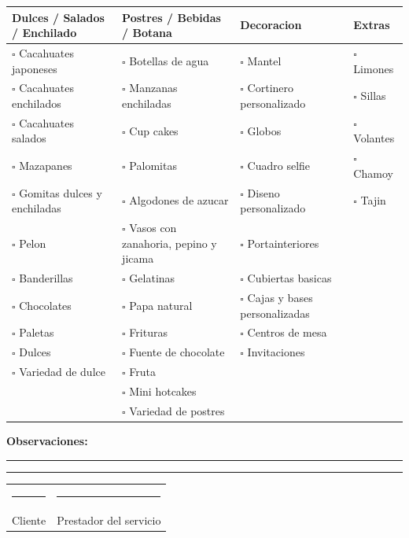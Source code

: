 \documentclass[letterpaper,11pt]{article}
\newcommand{\boxitem}[1]{$\square$ #1}
\begin{document}
\small
\begin{tabularx}{\textwidth}{|>{\raggedright\arraybackslash}X|>{\raggedright\arraybackslash}X|>{\raggedright\arraybackslash}X|>{\raggedright\arraybackslash}X|}
\hline
\centering\textbf{Dulces / Salados / Enchilado} &
\centering\textbf{Postres / Bebidas / Botana} &
\centering\textbf{Decoracion} &
\centering\arraybackslash\textbf{Extras} \\
\hline
\boxitem{Cacahuates japoneses} & \boxitem{Botellas de agua} & \boxitem{Mantel} & \boxitem{Limones} \\
\boxitem{Cacahuates enchilados} & \boxitem{Manzanas enchiladas} & \boxitem{Cortinero personalizado} & \boxitem{Sillas} \\
\boxitem{Cacahuates salados} & \boxitem{Cup cakes} & \boxitem{Globos} & \boxitem{Volantes} \\
\boxitem{Mazapanes} & \boxitem{Palomitas} & \boxitem{Cuadro selfie} & \boxitem{Chamoy} \\
\boxitem{Gomitas dulces y enchiladas} & \boxitem{Algodones de azucar} & \boxitem{Diseno personalizado} & \boxitem{Tajin} \\
\boxitem{Pelon} & \boxitem{Vasos con zanahoria, pepino y jicama} & \boxitem{Portainteriores} & \\
\boxitem{Banderillas} & \boxitem{Gelatinas} & \boxitem{Cubiertas basicas} & \\
\boxitem{Chocolates} & \boxitem{Papa natural} & \boxitem{Cajas y bases personalizadas} & \\
\boxitem{Paletas} & \boxitem{Frituras} & \boxitem{Centros de mesa} & \\
\boxitem{Dulces} & \boxitem{Fuente de chocolate} & \boxitem{Invitaciones} & \\
\boxitem{Variedad de dulce} & \boxitem{Fruta} & & \\
& \boxitem{Mini hotcakes} & & \\
& \boxitem{Variedad de postres} & & \\
\hline
\end{tabularx}

\normalsize
\vspace{0.55cm}

\textbf{Observaciones:}

\vspace{0.15cm}
\rule{\textwidth}{0.4pt}
\vspace{0.35cm}
\rule{\textwidth}{0.4pt}

\vfill

\begin{tabularx}{\textwidth}{X X}
\centering\rule{6cm}{0.4pt} & \centering\arraybackslash\rule{6cm}{0.4pt} \\
\centering Cliente & \centering\arraybackslash Prestador del servicio \\
\end{tabularx}
\end{document}
